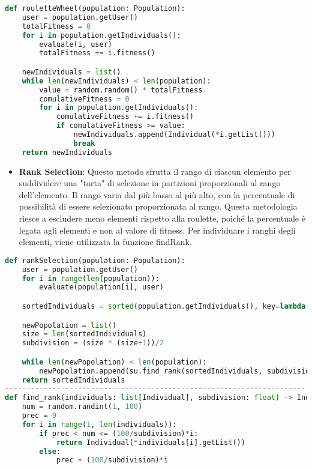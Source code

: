 \documentclass{article}
\begin{document}
\begin{lstlisting}[language=Python, breaklines, no caption]
def rouletteWheel(population: Population):
    user = population.getUser()
    totalFitness = 0
    for i in population.getIndividuals():
        evaluate(i, user)
        totalFitness += i.fitness()

    newIndividuals = list()
    while len(newIndividuals) < len(population):
        value = random.random() * totalFitness
        comulativeFitness = 0
        for i in population.getIndividuals():
            comulativeFitness += i.fitness()
            if comulativeFitness >= value:
                newIndividuals.append(Individual(*i.getList()))
                break
    return newIndividuals
\end{lstlisting}

\begin{itemize}
\item\textbf{Rank Selection}: Questo metodo sfrutta il rango di ciascun elemento per suddividere una "torta" di selezione in partizioni proporzionali al rango dell'elemento. Il rango varia dal più basso al più alto, con la percentuale di possibilità di essere selezionato proporzionata al rango. Questa metodologia riesce a escludere meno elementi rispetto alla roulette, poiché la percentuale è legata agli elementi e non al valore di fitness. Per individuare i ranghi degli elementi, viene utilizzata la funzione findRank.

\end{itemize}

\begin{lstlisting}[language=Python, breaklines, no caption]
def rankSelection(population: Population):
    user = population.getUser()
    for i in range(len(population)):
        evaluate(population[i], user)

    sortedIndividuals = sorted(population.getIndividuals(), key=lambda ind: ind.fitness())

    newPopolation = list()
    size = len(sortedIndividuals)
    subdivision = (size * (size+1))/2

    while len(newPopolation) < len(population):
        newPopolation.append(su.find_rank(sortedIndividuals, subdivision))
    return sortedIndividuals
---------------------------------------------------------------------------------------
def find_rank(individuals: list[Individual], subdivision: float) -> Individual:
    num = random.randint(1, 100)
    prec = 0
    for i in range(1, len(individuals)):
        if prec < num <= (100/subdivision)*i:
            return Individual(*individuals[i].getList())
        else:
            prec = (100/subdivision)*i
\end{lstlisting}
\end{document}
